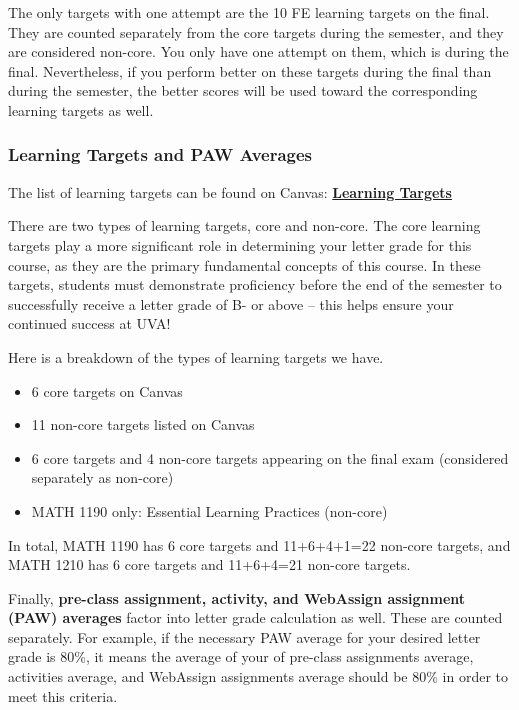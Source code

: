 \documentclass[12pt]{article}
\begin{document}

        The only targets with one attempt are the 10 FE learning targets on the final. They are counted separately from the core targets during the semester, and they are considered non-core. You only have one attempt on them, which is during the final. Nevertheless, if you perform better on these targets during the final than during the semester, the better scores will be used toward the corresponding learning targets as well.

        \subsubsection{Learning Targets and PAW Averages}

        The list of learning targets can be found on Canvas: \textbf{\href{https://canvas.its.virginia.edu/courses/177534/pages/learning-targets?module_item_id=1939840}{\large Learning Targets}}

        There are two types of learning targets, core and non-core. The core learning targets play a more significant role in determining your letter grade for this course, as they are the primary fundamental concepts of this course. In these targets, students must demonstrate proficiency before the end of the semester to successfully receive a letter grade of B- or above – this helps ensure your continued success at UVA!

        Here is a breakdown of the types of learning targets we have.
        \begin{itemize}
            \item 6 core targets on Canvas
            \item 11 non-core targets listed on Canvas
            \item 6 core targets and 4 non-core targets appearing on the final exam (considered separately as non-core)
            \item MATH 1190 only: Essential Learning Practices (non-core)
        \end{itemize}

        In total, MATH 1190 has 6 core targets and 11+6+4+1=22 non-core targets, and MATH 1210 has 6 core targets and 11+6+4=21 non-core targets.

        Finally, \textbf{pre-class assignment, activity, and WebAssign assignment (PAW) averages} factor into letter grade calculation as well. These are counted separately. For example, if the necessary PAW average for your desired letter grade is 80\%, it means the average of your of pre-class assignments average, activities average, and WebAssign assignments average should be 80\% in order to meet this criteria.
        
\end{document}

